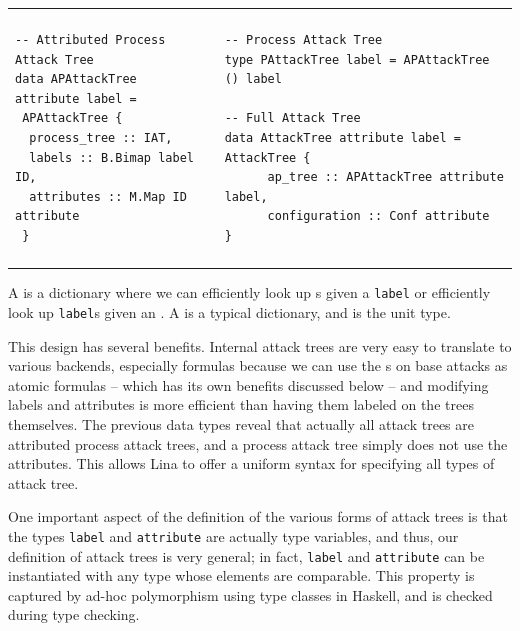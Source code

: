 \documentclass{llncs}
\begin{document}
\noindent \begin{tabular}{|l|ll|}
  \hline & & \\[-7px]
    \begin{minipage}{2in}        
    \begin{verbatim}
-- Attributed Process Attack Tree
data APAttackTree attribute label =
 APAttackTree {
  process_tree :: IAT,
  labels :: B.Bimap label ID,
  attributes :: M.Map ID attribute
 } 
    \end{verbatim}
    \vspace{-2px}
  \end{minipage}  
  & \quad &
    \begin{minipage}{2.4in}        
    \begin{verbatim}
-- Process Attack Tree
type PAttackTree label = APAttackTree () label

-- Full Attack Tree
data AttackTree attribute label = AttackTree {            
      ap_tree :: APAttackTree attribute label,
      configuration :: Conf attribute
}
    \end{verbatim}
    \end{minipage}\\
    & &\\    
    \hline
\end{tabular}

\noindent
A  is a dictionary where we can efficiently look up
s given a \verb!label! or efficiently look up \verb!label!s
given an . A  is a typical dictionary, and \mh{()} is
the unit type.

This design has several benefits. Internal attack trees are very easy
to translate to various backends, especially formulas because we can
use the s on base attacks as atomic formulas -- which has its
own benefits discussed below -- and modifying labels and attributes is
more efficient than having them labeled on the trees themselves.  The
previous data types reveal that actually all attack trees are
attributed process attack trees, and a process attack tree simply does
not use the attributes.  This allows Lina to offer a uniform syntax
for specifying all types of attack tree.

One important aspect of the definition of the various forms of attack
trees is that the types \verb!label! and \verb!attribute! are actually
type variables, and thus, our definition of attack trees is very
general; in fact, \verb!label! and \verb!attribute! can be
instantiated with any type whose elements are comparable.  This
property is captured by ad-hoc polymorphism using type classes in
Haskell, and is checked during type checking.
\end{document}
